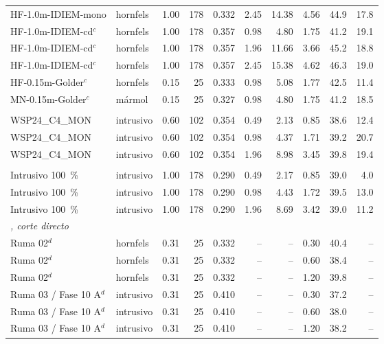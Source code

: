 \documentclass[11pt,letterpaper]{article}
\begin{document}
\begin{footnotesize}
\begin{longtable}{lllrrrrrrr}
HF-1.0m-IDIEM-mono & hornfels & 1.00 & 178 & 0.332 & 2.45 & 14.38 & 4.56 & 44.9 & 17.8 \\
HF-1.0m-IDIEM-cd$^{c}$ & hornfels & 1.00 & 178 & 0.357 & 0.98 & 4.80 & 1.75 & 41.2 & 19.1 \\
HF-1.0m-IDIEM-cd$^{c}$ & hornfels & 1.00 & 178 & 0.357 & 1.96 & 11.66 & 3.66 & 45.2 & 18.8 \\
HF-1.0m-IDIEM-cd$^{c}$ & hornfels & 1.00 & 178 & 0.357 & 2.45 & 15.38 & 4.62 & 46.3 & 19.0 \\
HF-0.15m-Golder$^{c}$ & hornfels & 0.15 & 25 & 0.333 & 0.98 & 5.08 & 1.77 & 42.5 & 11.4 \\
MN-0.15m-Golder$^{c}$ & mármol & 0.15 & 25 & 0.327 & 0.98 & 4.80 & 1.75 & 41.2 & 18.5 \\
\midrule \multicolumn{10}{l}{\textit{\citet{w2024}}} \\
WSP24\_C4\_MON & intrusivo & 0.60 & 102 & 0.354 & 0.49 & 2.13 & 0.85 & 38.6 & 12.4 \\
WSP24\_C4\_MON & intrusivo & 0.60 & 102 & 0.354 & 0.98 & 4.37 & 1.71 & 39.2 & 20.7 \\
WSP24\_C4\_MON & intrusivo & 0.60 & 102 & 0.354 & 1.96 & 8.98 & 3.45 & 39.8 & 19.4 \\
\midrule \multicolumn{10}{l}{\textit{\citet{i2025}}} \\
Intrusivo 100~\% & intrusivo & 1.00 & 178 & 0.290 & 0.49 & 2.17 & 0.85 & 39.0 & 4.0 \\
Intrusivo 100~\% & intrusivo & 1.00 & 178 & 0.290 & 0.98 & 4.43 & 1.72 & 39.5 & 13.0 \\
Intrusivo 100~\% & intrusivo & 1.00 & 178 & 0.290 & 1.96 & 8.69 & 3.42 & 39.0 & 11.2 \\
\midrule \multicolumn{10}{l}{\textit{\citet{anddes2024}, corte directo}} \\
Ruma 02$^{d}$ & hornfels & 0.31 & 25 & 0.332 & -- & -- & 0.30 & 40.4 & -- \\
Ruma 02$^{d}$ & hornfels & 0.31 & 25 & 0.332 & -- & -- & 0.60 & 38.4 & -- \\
Ruma 02$^{d}$ & hornfels & 0.31 & 25 & 0.332 & -- & -- & 1.20 & 39.8 & -- \\
Ruma 03 / Fase 10 A$^{d}$ & intrusivo & 0.31 & 25 & 0.410 & -- & -- & 0.30 & 37.2 & -- \\
Ruma 03 / Fase 10 A$^{d}$ & intrusivo & 0.31 & 25 & 0.410 & -- & -- & 0.60 & 38.0 & -- \\
Ruma 03 / Fase 10 A$^{d}$ & intrusivo & 0.31 & 25 & 0.410 & -- & -- & 1.20 & 38.2 & -- \\

\end{longtable}
\end{footnotesize}
\end{document}
